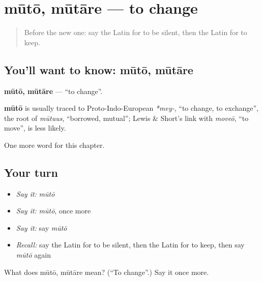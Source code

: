 \section[mūtō, mūtāre]{mūtō, mūtāre — to change}

\label{lesson:LA-C159-muto}



\begin{quote}
Before the new one: say the Latin for to be silent, then the Latin for to keep.
\end{quote}

\subsection*{You'll want to know: mūtō, mūtāre}
\textbf{mūtō, mūtāre} — \textquotedblleft{}to change\textquotedblright{}.

\begin{cousinweb}
\textbf{mūtō} is usually traced to Proto-Indo-European \emph{*mey-}, \textquotedblleft{}to change, to exchange\textquotedblright{}, the root of \emph{mūtuus}, \textquotedblleft{}borrowed, mutual\textquotedblright{}; Lewis \& Short's link with \emph{moveō}, \textquotedblleft{}to move\textquotedblright{}, is less likely.
\end{cousinweb}

\begin{grammarlens}[title={What you've built}]
One more word for this chapter.
\end{grammarlens}

\subsection*{Your turn}
\begin{itemize}
\raggedright
  \item \emph{Say it:} \emph{mūtō}
  \item \emph{Say it:} \emph{mūtō}, once more
  \item \emph{Say it:} say \emph{mūtō}
  \item \emph{Recall:} say the Latin for to be silent, then the Latin for to keep, then say \emph{mūtō} again
\end{itemize}

\begin{tcolorbox}[breakable,colback=teal!4,colframe=teal!35!black,title={Before you move on}]
What does mūtō, mūtāre mean? (\textquotedblleft{}To change\textquotedblright{}.) Say it once more.
\end{tcolorbox}
